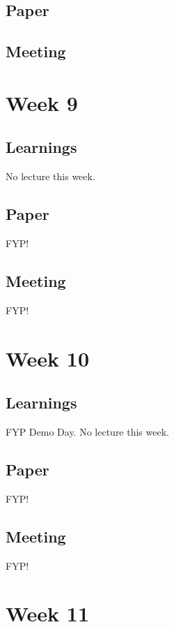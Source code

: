 \section{Paper}

\section{Meeting}
\chapter{Week 9}

\section{Learnings}

No lecture this week.

\section{Paper}

FYP!

\section{Meeting}

FYP!

\chapter{Week 10}

\section{Learnings}

FYP Demo Day. No lecture this week.

\section{Paper}

FYP!

\section{Meeting}

FYP!

\chapter{Week 11}

